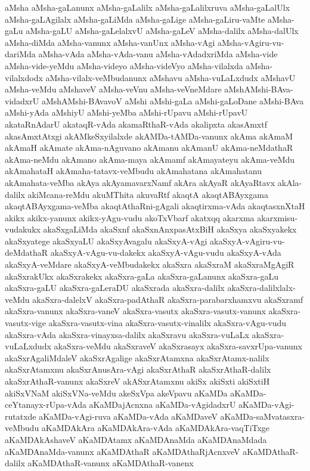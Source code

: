 {aMsha
aMsha-gaLanunx
aMsha-gaLalilx
aMsha-gaLalilxruva
aMsha-gaLalUlx
aMsha-gaLAgilalx
aMsha-gaLiMda
aMsha-gaLige
aMsha-gaLiru-vaMte
aMsha-gaLu
aMsha-gaLU
aMsha-gaLelalxvU
aMsha-gaLeV
aMsha-dalilx
aMsha-dalUlx
aMsha-diMda
aMsha-vanunx
aMsha-vanUnx
aMsha-vAgi
aMsha-vAgiru-vu-dariMda
aMsha-vAda
aMsha-vAda-vanu
aMsha-vAdadxriMda
aMsha-vide
aMsha-vide-yeMdu
aMsha-videyo
aMsha-videVyo
aMsha-vilalxda
aMsha-vilalxdodx
aMsha-vilalx-veMbudanunx
aMshavu
aMsha-vuLaLxdudx
aMshavU
aMsha-veMdu
aMshaveV
aMsha-veVnu
aMsha-veVneMdare
aMshAMshi-BAva-vidadxrU
aMshAMshi-BAvavoV
aMshi
aMshi-gaLa
aMshi-gaLoDane
aMshi-BAva
aMshi-yAda
aMshiyU
aMshi-yeMba
aMshi-rUpavu
aMshi-rUpavU
akataRnAdarU
akataqR-vAda
akamaRthaR-vAda
akalipxta
akasAmxtf
akasAmxtAtxgi
akAMkeSxyilalxde
akAMDa-tAMDa-vanunx
akAma
akAmaM
akAmaH
akAmate
akAma-nAguvano
akAmanu
akAmanU
akAma-neMdathaR
akAma-neMdu
akAmano
akAma-maya
akAmamf
akAmayateyu
akAma-veMdu
akAmahataH
akAmaha-tatavx-veMbudu
akAmahatana
akAmahatanu
akAmahata-veMba
akAya
akAyamavarxNamf
akAra
akAyaR
akAyaRtavx
akAla-dalilx
akiMcana-reMdu
akuMThita
akuvaRtf
akaqtA
akaqtABAyxgama
akaqtABAyxgama-veMba
akaqtAthaRni-gAgali
akaqtirxma-vAda
akaqtasxnXtaH
akikx
akikx-yanunx
akikx-yAgu-vudu
akoTxVbarf
akatxqq
akarxma
akarxmisu-vudakukx
akaSxgaLiMda
akaSxnf
akaSxnAnxpasAtxBiH
akaSxya
akaSxyakekx
akaSxyatege
akaSxyaLU
akaSxyAvagalu
akaSxyA-vAgi
akaSxyA-vAgiru-vu-deMdathaR
akaSxyA-vAgu-vu-dakekx
akaSxyA-vAgu-vudu
akaSxyA-vAda
akaSxyA-veMdare
akaSxyA-veMbudakekx
akaSxra
akaSxraM
akaSxraMgAgiR
akaSxrakUkx
akaSxrakekx
akaSxra-gaLa
akaSxra-gaLanunx
akaSxra-gaLu
akaSxra-gaLU
akaSxra-gaLeraDU
akaSxrada
akaSxra-dalilx
akaSxra-dalilxlalx-veMdu
akaSxra-dalelxV
akaSxra-padAthaR
akaSxra-parabarxhamxvu
akaSxramf
akaSxra-vanunx
akaSxra-vaneV
akaSxra-vasutx
akaSxra-vasutx-vanunx
akaSxra-vasutx-vige
akaSxra-vasutx-vina
akaSxra-vasutx-vinalilx
akaSxra-vAgu-vudu
akaSxra-vAda
akaSxra-vinayxsa-dalilx
akaSxravu
akaSxra-vuLaLx
akaSxra-vuLaLxdudx
akaSxra-veMdu
akaSxraveV
akaSxrasayx
akaSxra-savxrUpa-vanunx
akaSxrAgaliMdaleV
akaSxrAgalige
akaSxrAtamxna
akaSxrAtamx-nalilx
akaSxrAtamxnu
akaSxrAnusAra-vAgi
akaSxrAthaR
akaSxrAthaR-dalilx
akaSxrAthaR-vanunx
akaSxreV
akASxrAtamxnu
akiSx
akiSxti
akiSxtiH
akiSxVNaM
akiSxVNa-veMdu
akeSxVpa
akeVpavu
aKaMDa
aKaMDa-ceYtanayx-rUpa-vAda
aKaMDajAcnxna
aKaMDa-vAgidadxrU
aKaMDa-vAgi-rutatxde
aKaMDa-vAgi-ruva
aKaMDa-vAda
aKaMDaveV
aKaMDa-saMvatasxra-veMbudu
aKaMDAkAra
aKaMDAkAra-vAda
aKaMDAkAra-vaqTiTxge
aKaMDAkAshaveV
aKaMDAtamx
aKaMDAnaMda
aKaMDAnaMdada
aKaMDAnaMda-vanunx
aKaMDAthaR
aKaMDAthaRjAcnxveV
aKaMDAthaR-dalilx
aKaMDAthaR-vanunx
aKaMDAthaR-vanenx
}
